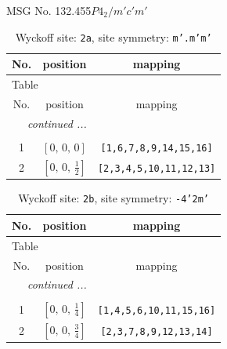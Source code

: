 \documentclass[fleqn,8pt]{jsarticle}
\begin{document}
\setcounter{MaxMatrixCols}{32}

\renewcommand{\tablename}{Table~}
\renewcommand{\figurename}{Figure~}
\begin{center}
\LARGE
MSG No. 132.455\quad$P4_{2}/m'c'm'$
\end{center}
\renewcommand{\arraystretch}{1.2}
\begin{longtable}{ccc}
\caption{Wyckoff site: {\tt 2a}, site symmetry: {\tt m'.m'm'}}
 \\
 \hline \hline
No. & position & mapping \\ \hline \endfirsthead

\multicolumn{2}{l}{\tablename\ \thetable{}} \\
 \hline \hline
No. & position & mapping \\ \hline \endhead

 \hline \hline
\multicolumn{2}{r}{\footnotesize\it continued ...} \\ \endfoot

 \hline \hline
\multicolumn{2}{r}{} \\ \endlastfoot

1 & $\left[ 0,\, 0,\, 0 \right]$ & {\tt [1,6,7,8,9,14,15,16]} \\ \hline
2 & $\left[ 0,\, 0,\, \frac{1}{2} \right]$ & {\tt [2,3,4,5,10,11,12,13]} \\
\end{longtable}
\renewcommand{\arraystretch}{1.2}
\begin{longtable}{ccc}
\caption{Wyckoff site: {\tt 2b}, site symmetry: {\tt -4'2m'}}
 \\
 \hline \hline
No. & position & mapping \\ \hline \endfirsthead

\multicolumn{2}{l}{\tablename\ \thetable{}} \\
 \hline \hline
No. & position & mapping \\ \hline \endhead

 \hline \hline
\multicolumn{2}{r}{\footnotesize\it continued ...} \\ \endfoot

 \hline \hline
\multicolumn{2}{r}{} \\ \endlastfoot

1 & $\left[ 0,\, 0,\, \frac{1}{4} \right]$ & {\tt [1,4,5,6,10,11,15,16]} \\ \hline
2 & $\left[ 0,\, 0,\, \frac{3}{4} \right]$ & {\tt [2,3,7,8,9,12,13,14]} \\
\end{longtable}
\end{document}
